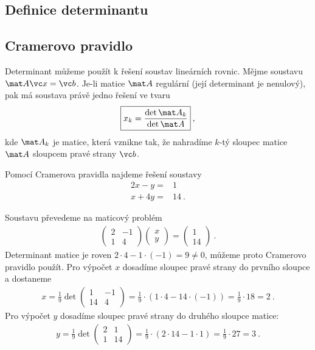 \subsection{Definice determinantu}

\subsection{Cramerovo pravidlo}

Determinant můžeme použít k řešení soustav lineárních rovnic. Mějme soustavu $\mat A \vc x = \vc b$. Je-li matice $\mat A$ regulární (její determinant je nenulový), pak má soustava právě jedno řešení ve tvaru \begin{align}
    \boxed{ x_k = \frac{\det \mat A_k}{\det \mat A} }\:,
\end{align}
kde $\mat A_k$ je matice, která vznikne tak, že nahradíme $k$-tý sloupec matice $\mat A$ sloupcem pravé strany $\vc b$.

\begin{example}
    Pomocí Cramerova pravidla najdeme řešení soustavy 
    \begin{align}
        2x - y =& 1 \\
        x + 4y =& 14 \:.
    \end{align}

    Soustavu převedeme na maticový problém \begin{align}
        \begin{pmatrix}
            2 & -1 \\ 1 & 4
        \end{pmatrix}
        \begin{pmatrix}
            x \\ y
        \end{pmatrix}
        =
        \begin{pmatrix}
            1 \\ 14
        \end{pmatrix} \:.
    \end{align}
    Determinant matice je roven $2 \cdot 4 - 1 \cdot (-1) = 9 \neq 0$, můžeme proto Cramerovo pravidlo použít. Pro výpočet $x$ dosadíme sloupec pravé strany do prvního sloupce a dostaneme \begin{align}
        x = \frac{1}{9} \det \begin{pmatrix}
            1 & -1 \\ 14 & 4
        \end{pmatrix}
        = \frac{1}{9} \cdot (1 \cdot 4 - 14 \cdot (-1) ) = \frac{1}{9} \cdot 18 = 2 \:.
    \end{align}
    Pro výpočet $y$ dosadíme sloupec pravé strany do druhého sloupce matice:
    \begin{align}
        y = \frac{1}{9} \det \begin{pmatrix}
            2 & 1 \\ 1 & 14
        \end{pmatrix}
        = \frac{1}{9} \cdot (2 \cdot 14 - 1 \cdot 1 ) = \frac{1}{9} \cdot 27 = 3 \:.
    \end{align}
\end{example}


